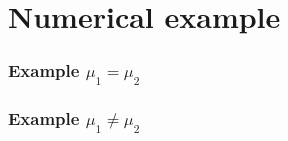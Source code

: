 \section{Numerical example}


\begin{frame}
  \frametitle{Example $\mu_1 = \mu_2$}
  \begin{block}{}
  \end{block}
\end{frame}


\begin{frame}
  \frametitle{Example $\mu_1 \neq \mu_2$}
  \begin{block}{}
  \end{block}
\end{frame}
